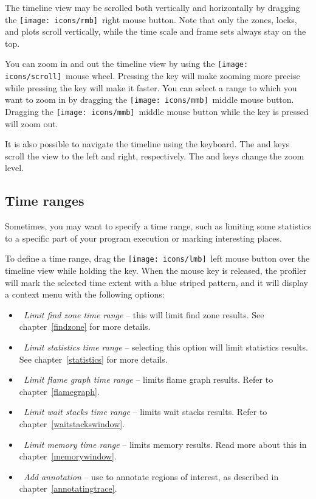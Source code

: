 \documentclass[hidelinks,titlepage,a4paper,twoside]{article}
\newcommand{\LMB}{\texttt{[image: icons/lmb]}}
\newcommand{\RMB}{\texttt{[image: icons/rmb]}}
\newcommand{\MMB}{\texttt{[image: icons/mmb]}}
\newcommand{\Scroll}{\texttt{[image: icons/scroll]}}
\begin{document}
The timeline view may be scrolled both vertically and horizontally by dragging the \RMB{}~right mouse button. Note that only the zones, locks, and plots scroll vertically, while the time scale and frame sets always stay on the top.

You can zoom in and out the timeline view by using the \Scroll{}~mouse wheel. Pressing the \keys{\ctrl} key will make zooming more precise while pressing the \keys{\shift} key will make it faster. You can select a range to which you want to zoom in by dragging the \MMB{}~middle mouse button. Dragging the \MMB{}~middle mouse button while the \keys{\ctrl} key is pressed will zoom out.

It is also possible to navigate the timeline using the keyboard. The  and  keys scroll the view to the left and right, respectively. The  and  keys change the zoom level.

\subsection{Time ranges}
\label{timeranges}

Sometimes, you may want to specify a time range, such as limiting some statistics to a specific part of your program execution or marking interesting places.

To define a time range, drag the \LMB{}~left mouse button over the timeline view while holding the \keys{\ctrl} key. When the mouse key is released, the profiler will mark the selected time extent with a blue striped pattern, and it will display a context menu with the following options:

\begin{itemize}
\item \emph{\faSearch{}~Limit find zone time range} -- this will limit find zone results. See chapter~\ref{findzone} for more details.
\item \emph{\faSortAmountUp{}~Limit statistics time range} -- selecting this option will limit statistics results. See chapter~\ref{statistics} for more details.
\item \emph{\faFire{}~Limit flame graph time range} -- limits flame graph results. Refer to chapter~\ref{flamegraph}.
\item \emph{\faHourglassHalf{}~Limit wait stacks time range} -- limits wait stacks results. Refer to chapter~\ref{waitstackswindow}.
\item \emph{\faMemory{}~Limit memory time range} -- limits memory results. Read more about this in chapter~\ref{memorywindow}.
\item \emph{\faStickyNote{}~Add annotation} -- use to annotate regions of interest, as described in chapter~\ref{annotatingtrace}.
\end{itemize}
\end{document}
